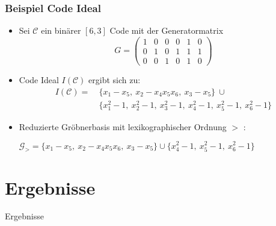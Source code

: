 \documentclass{beamer}
\begin{document}
\begin{frame}[<+->]
\frametitle{Beispiel Code Ideal}
\begin{itemize}
\item 
Sei $\mathcal{C}$ ein binärer $[6,3]$ Code mit der Generatormatrix
\[
G =
\begin{pmatrix}
1 & 0 & 0 & 0 & 1 & 0 \\ 
0 & 1 & 0 & 1 & 1 & 1 \\  
0 & 0 & 1 & 0 & 1 & 0  
\end{pmatrix} 
\]

\item Code Ideal $I(\mathcal{C})$ ergibt sich zu: 
\begin{align*}
I(\mathcal{C}) = &~\{x_{1}-x_{5},~x_{2}-x_{4}x_{5}x_{6},~x_{3}-x_{5}  \} ~\cup \\ &~\{x_{1}^{2}-1,~x_{2}^{2}-1,~x_{3}^{2}-1,~x_{4}^{2}-1,~x_{5}^{2}-1,~x_{6}^{2}-1\}
\end{align*}
\item Reduzierte Gröbnerbasis mit lexikographischer Ordnung $>$ :
\begin{center}
$ \mathcal{G}_{>} = \{x_{1}-x_{5},~x_{2}-x_{4}x_{5}x_{6},~x_{3}-x_{5}  \} \cup \{x_{4}^{2}-1,~x_{5}^{2}-1,~x_{6}^{2}-1  \}  $
\end{center} 

\end{itemize}
\end{frame}

\section{Ergebnisse}

\begin{frame}

\centerline{Ergebnisse}


\end{frame}
\end{document}
